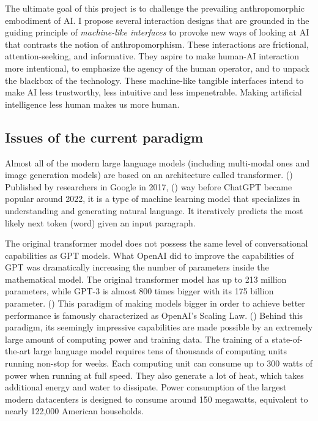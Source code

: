\documentclass[12pt]{article}
\begin{document}
The ultimate goal of this project is to challenge the prevailing anthropomorphic embodiment of AI. I propose several interaction designs that are grounded in the guiding principle of \textit{machine-like interfaces} to provoke new ways of looking at AI that contrasts the notion of anthropomorphism. These interactions are frictional, attention-seeking, and informative. They aspire to make human-AI interaction more intentional,  to emphasize the agency of the human operator, and to unpack the blackbox of the technology. These machine-like tangible interfaces intend to make AI less trustworthy, less intuitive and less impenetrable. Making artificial intelligence less human makes us more human.

\subsection{Issues of the current paradigm}
Almost all of the modern large language models (including multi-modal ones and image generation models) are based on an architecture called transformer. (\cite{bommasani2022opportunitiesrisksfoundationmodels}) Published by researchers in Google in 2017, (\cite{vaswani2023attentionneed}) way before ChatGPT became popular around 2022, it is a type of machine learning model that specializes in understanding and generating natural language. It iteratively predicts the most likely next token (word) given an input paragraph.

The original transformer model does not possess the same level of conversational capabilities as GPT models. What OpenAI did to improve the capabilities of GPT was dramatically increasing the number of parameters inside the mathematical model. The original transformer model has up to 213 million parameters, while GPT-3 is almost 800 times bigger with its 175 billion parameter. (\cite{brown2020languagemodelsfewshotlearners}) This paradigm of making models bigger in order to achieve better performance is famously characterized as OpenAI's Scaling Law. (\cite{scaling}) Behind this paradigm, its seemingly impressive capabilities are made possible by an extremely large amount of computing power and training data. The training of a state-of-the-art large language model requires tens of thousands of computing units running non-stop for weeks. Each computing unit can consume up to 300 watts of power when running at full speed. They also generate a lot of heat, which takes additional energy and water to dissipate. Power consumption of the largest modern datacenters is designed to consume around 150 megawatts, equivalent to nearly 122,000 American households.
\end{document}

